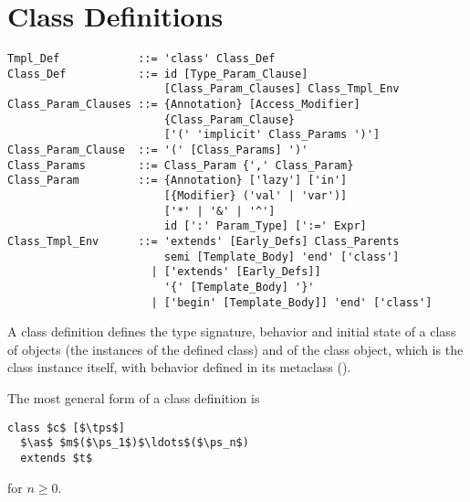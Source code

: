 \section{Class Definitions}
\label{sec:class-definitions}

\syntax\begin{lstlisting}
Tmpl_Def            ::= 'class' Class_Def
Class_Def           ::= id [Type_Param_Clause] 
                        [Class_Param_Clauses] Class_Tmpl_Env
Class_Param_Clauses ::= {Annotation} [Access_Modifier] 
                        {Class_Param_Clause}
                        ['(' 'implicit' Class_Params ')']
Class_Param_Clause  ::= '(' [Class_Params] ')'
Class_Params        ::= Class_Param {',' Class_Param}
Class_Param         ::= {Annotation} ['lazy'] ['in'] 
                        [{Modifier} ('val' | 'var')]
                        ['*' | '&' | '^']
                        id [':' Param_Type] [':=' Expr]
Class_Tmpl_Env      ::= 'extends' [Early_Defs] Class_Parents
                        semi [Template_Body] 'end' ['class']
                      | ['extends' [Early_Defs]] 
                        '{' [Template_Body] '}'
                      | ['begin' [Template_Body]] 'end' ['class']
\end{lstlisting}

A class definition defines the type signature, behavior and initial state of a class of objects (the instances of the defined class) and of the class object, which is the class instance itself, with behavior defined in its metaclass (). 

The most general form of a class definition is
\begin{lstlisting}
class $c$ [$\tps$]
  $\as$ $m$($\ps_1$)$\ldots$($\ps_n$)
  extends $t$
\end{lstlisting}
for $n \geq 0$. 

